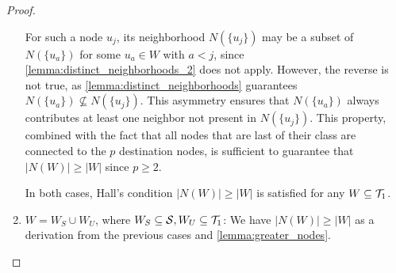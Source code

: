 \begin{proof}
\begin{enumerate}[leftmargin=25pt]
        For such a node $u_j$, its neighborhood $N(\{u_j\})$ may be a subset of $N(\{u_a\})$ for some $u_a \in W$ with $a < j$, since \cref{lemma:distinct_neighborhoods_2} does not apply. However, the reverse is not true, as \cref{lemma:distinct_neighborhoods} guarantees $N(\{u_a\}) \not\subseteq N(\{u_j\})$. This asymmetry ensures that $N(\{u_a\})$ always contributes at least one neighbor not present in $N(\{u_j\})$. This property, combined with the fact that all nodes that are last of their class are connected to the $p$ destination nodes, is sufficient to guarantee that $|N(W)| \ge |W|$ since $p \geq 2$.

        In both cases, Hall's condition $|N(W)| \geq |W|$ is satisfied for any $W \subseteq \mathcal{T}_{1}$.
        
        \item $W=W_S \cup W_U$, where $W_S \subseteq \mathcal{S}, W_U \subseteq \mathcal{T}_{1}$: We have $|N(W)| \geq |W|$ as a derivation from the previous cases and \cref{lemma:greater_nodes}.
    \end{enumerate}
\end{proof}

